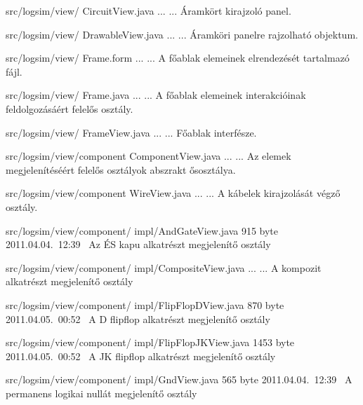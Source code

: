 \begin{fajllista}
\fajl
{src/logsim/view/\newline
CircuitView.java}
{...}
{...}
{Áramkört kirajzoló panel.}

\fajl
{src/logsim/view/\newline
DrawableView.java}
{...}
{...}
{Áramköri panelre rajzolható objektum.}

\fajl
{src/logsim/view/\newline
Frame.form}
{...}
{...}
{A főablak elemeinek elrendezését tartalmazó fájl.}

\fajl
{src/logsim/view/\newline
Frame.java}
{...}
{...}
{A főablak elemeinek interakcióinak feldolgozásáért felelős osztály.}

\fajl
{src/logsim/view/\newline
FrameView.java}
{...}
{...}
{Főablak interfésze.}

\fajl
{src/logsim/view/component\newline
ComponentView.java}
{...}
{...}
{Az elemek megjelenítéséért felelős osztályok abszrakt ősosztálya.}

\fajl
{src/logsim/view/component\newline
WireView.java}
{...}
{...}
{A kábelek kirajzolását végző osztály.}

\fajl
{src/logsim/view/component/\newline
impl/AndGateView.java} %
{915 byte} %
{2011.04.04.~12:39~} %
{Az ÉS kapu alkatrészt megjelenítő osztály} %

\fajl
{src/logsim/view/component/\newline
impl/CompositeView.java}
{...}
{...}
{A kompozit alkatrészt megjelenítő osztály}

\fajl
{src/logsim/view/component/\newline
impl/FlipFlopDView.java} %
{870 byte} %
{2011.04.05.~00:52~} %
{A D flipflop alkatrészt megjelenítő osztály} %

\fajl
{src/logsim/view/component/\newline
impl/FlipFlopJKView.java} %
{1453 byte} %
{2011.04.05.~00:52~} %
{A JK flipflop alkatrészt megjelenítő osztály} %

\fajl
{src/logsim/view/component/\newline
impl/GndView.java} %
{565 byte} %
{2011.04.04.~12:39~} %
{A permanens logikai nullát megjelenítő osztály} %


\end{fajllista}
